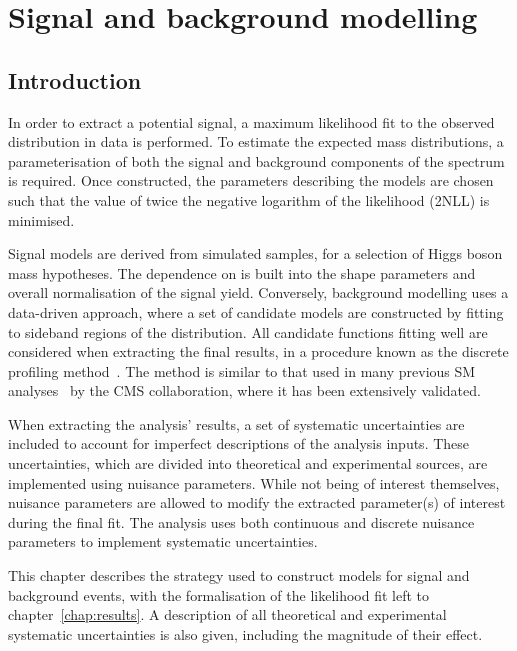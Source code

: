 \chapter{Signal and background modelling}
\label{chap:s_b_modelling}

\section{Introduction}

In order to extract a potential \Hee signal, a maximum likelihood fit to the observed \mee distribution in data is performed. To estimate the expected mass distributions, a parameterisation of both the signal and background components of the \mee spectrum is required. Once constructed, the parameters describing the models are chosen such that the value of twice the negative logarithm of the likelihood (2NLL) is minimised. 

Signal models are derived from simulated samples, for a selection of Higgs boson mass hypotheses. The dependence on \mH is built into the shape parameters and overall normalisation of the signal yield. Conversely, background modelling uses a data-driven approach, where a set of candidate models are constructed by fitting to sideband regions of the \mee distribution. All candidate functions fitting well are considered when extracting the final results, in a procedure known as the discrete profiling method~\cite{envelope_method}. The method is similar to that used in many previous SM \Hgg analyses~\cite{HIG-16-040,HIG-18-029,HIG-19-015} by the CMS collaboration, where it has been extensively validated.

When extracting the analysis' results, a set of systematic uncertainties are included to account for imperfect descriptions of the analysis inputs. These uncertainties, which are divided into theoretical and experimental sources, are implemented using nuisance parameters. While not being of interest themselves, nuisance parameters are allowed to modify the extracted parameter(s) of interest during the final fit. The analysis uses both continuous and discrete nuisance parameters to implement systematic uncertainties.

This chapter describes the strategy used to construct models for signal and background events, with the formalisation of the likelihood fit left to chapter~\ref{chap:results}. A description of all theoretical and experimental systematic uncertainties is also given, including the magnitude of their effect.

